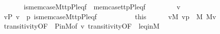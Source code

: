 \begin{isabellebody}
\ \ \isanewline
\ \ \ \ {\isachardoublequoteopen}is{\isacharunderscore}{\kern0pt}mem{\isacharunderscore}{\kern0pt}case{\isacharparenleft}{\kern0pt}{\isacharhash}{\kern0pt}{\isacharhash}{\kern0pt}M{\isacharcomma}{\kern0pt}t{}{\isacharcomma}{\kern0pt}t{}{\isacharcomma}{\kern0pt}p{\isacharcomma}{\kern0pt}P{\isacharcomma}{\kern0pt}leq{\isacharcomma}{\kern0pt}f{\isacharparenright}{\kern0pt}\ {\isasymlongleftrightarrow}\ mem{\isacharunderscore}{\kern0pt}case{\isacharparenleft}{\kern0pt}t{}{\isacharcomma}{\kern0pt}t{}{\isacharcomma}{\kern0pt}p{\isacharcomma}{\kern0pt}P{\isacharcomma}{\kern0pt}leq{\isacharcomma}{\kern0pt}f{\isacharparenright}{\kern0pt}{\isachardoublequoteclose}\isanewline
%
\isadelimproof
%
\endisadelimproof
%
\isatagproof
{}\isamarkupfalse%
\isanewline
\ \ \isacommand{{\isacharbraceleft}{\kern0pt}}\isamarkupfalse%
\isanewline
\ \ \ \ \isamarkupfalse%
\ v\isanewline
\ \ \ \ \isamarkupfalse%
\ {\isachardoublequoteopen}v{\isasymin}P{\isachardoublequoteclose}\ {\isachardoublequoteopen}v\ {\isasympreceq}\ p{\isachardoublequoteclose}\ {\isachardoublequoteopen}is{\isacharunderscore}{\kern0pt}mem{\isacharunderscore}{\kern0pt}case{\isacharparenleft}{\kern0pt}{\isacharhash}{\kern0pt}{\isacharhash}{\kern0pt}M{\isacharcomma}{\kern0pt}t{}{\isacharcomma}{\kern0pt}t{}{\isacharcomma}{\kern0pt}p{\isacharcomma}{\kern0pt}P{\isacharcomma}{\kern0pt}leq{\isacharcomma}{\kern0pt}f{\isacharparenright}{\kern0pt}{\isachardoublequoteclose}\isanewline
\ \ \ \ \isamarkupfalse%
\isanewline
\ \ \ \ \isamarkupfalse%
\ this\isanewline
\ \ \ \ \isamarkupfalse%
\ {\isachardoublequoteopen}v{\isasymin}M{\isachardoublequoteclose}\ {\isachardoublequoteopen}{\isasymlangle}v{\isacharcomma}{\kern0pt}p{\isasymrangle}\ {\isasymin}\ M{\isachardoublequoteclose}\ {\isachardoublequoteopen}{\isacharparenleft}{\kern0pt}{\isacharhash}{\kern0pt}{\isacharhash}{\kern0pt}M{\isacharparenright}{\kern0pt}{\isacharparenleft}{\kern0pt}v{\isacharparenright}{\kern0pt}{\isachardoublequoteclose}\isanewline
\ \ \ \ \ \ \isamarkupfalse%
\ transitivity{\isacharbrackleft}{\kern0pt}OF\ {\isacharunderscore}{\kern0pt}\ P{\isacharunderscore}{\kern0pt}in{\isacharunderscore}{\kern0pt}M{\isacharcomma}{\kern0pt}of\ v{\isacharbrackright}{\kern0pt}\ transitivity{\isacharbrackleft}{\kern0pt}OF\ {\isacharunderscore}{\kern0pt}\ leq{\isacharunderscore}{\kern0pt}in{\isacharunderscore}{\kern0pt}M{\isacharbrackright}{\kern0pt}\isanewline

\end{isabellebody}
